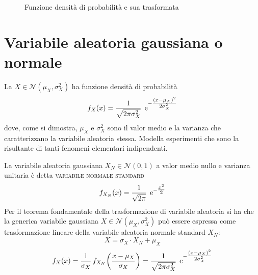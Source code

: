 \begin{esempio}
\begin{figure}[h]
\centering
{}\qquad
{}
\caption{Funzione densità di probabilità e sua trasformata}
\end{figure}

\end{esempio}

\section{Variabile aleatoria gaussiana o normale}
La  $X\in\mathcal{N}(\mu_X,\sigma^2_X)$ ha funzione densità di probabilità
\begin{equation}\label{eq:densita_gaussiana}
f_X(x)=\frac{1}{\sqrt{2\pi\sigma^2_X}}\;\operatorname{e}^{-\tfrac{(x-\mu_X)^2}{2\sigma^2_X}}
\end{equation}
dove, come si dimostra, $\mu_X$ e $\sigma^2_X$ sono il valor medio e la varianza che caratterizzano la variabile aleatoria stessa.
Modella esperimenti che sono la risultante di tanti fenomeni elementari indipendenti.

La variabile aleatoria gaussiana $X_N\in\mathcal{N}(0,1)$ a valor medio nullo e varianza unitaria è detta \textsc{variabile normale standard}
\begin{equation}\label{eq:densita_normale}
f_{X_N}(x)=\frac{1}{\sqrt{2\pi}}\;\operatorname{e}^{-\tfrac{x^2}{2}}
\end{equation}
Per il teorema fondamentale della trasformazione di variabile aleatoria si ha che la generica variabile gaussiana $X\in\mathcal{N}(\mu_X,\sigma^2_X)$ può essere espressa come trasformazione lineare della variabile aleatoria normale standard $X_N$:
\begin{equation}X=\sigma_X\cdot X_N+\mu_X\end{equation}
\begin{equation}
f_X(x)=\frac{1}{\sigma_X}\,{f_{X_N}}^{}\!\left({\frac{x-\mu_X}{\sigma_X}}\right)=\frac{1}{\sqrt{2\pi\sigma^2_X}}\;\operatorname{e}^{-\tfrac{(x-\mu_X)^2}{2\sigma^2_X}}
\end{equation}


